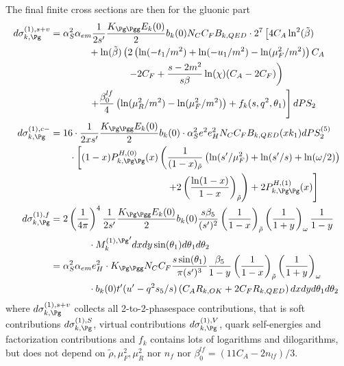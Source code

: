 The final finite cross sections are then for the gluonic part
\begin{align}
d\sigma_{k,\Pg}^{(1),s+v} &= \alpha_S^2\alpha_{em} \frac 1 {2s'} \frac {K_{\Pg\Pgg}E_k(0)} 2 b_k(0) N_C C_F B_{k,QED} \cdot 2^7 \left[ 4C_A\ln^2(\tilde\beta) \right.\nonumber\\
 &\hspace{40pt} +\ln(\tilde\beta)\left( 	2\left(\ln(-t_1/m^2)+\ln(-u_1/m^2)-\ln(\mu_F^2/m^2)\right)C_A \right. \nonumber\\
 &\hspace{80pt}\left. - 2C_F + \frac{s-2m^2}{s\beta}\ln(\chi)(C_A-2C_F) \right) \nonumber\\
 &\hspace{40pt}\left. + \frac {\beta_0^{lf}}{4}\left(\ln(\mu_R^2/m^2)- \ln(\mu_F^2/m^2)\right) + f_k(s,q^2,\theta_1) \right] dPS_2\\
d\sigma_{k,\Pg}^{(1),c-} &= 16\cdot \frac 1 {2xs'} \frac {K_{\Pg\Pgg}E_k(0)} 2 b_k(0) \cdot \alpha_S^2e^2e_H^2N_C C_F B_{k,QED}(xk_1) dPS_{2}^{(5)} \nonumber\\
 &\hspace{20pt}\cdot \left[ (1-x)P_{k,\Pg\Pg}^{H,(0)}(x)\left(\frac{1}{(1-x)_{\tilde\rho}}\left(\ln(s'/\mu_F^2) + \ln(s'/s) + \ln(\omega/2)\right) \right.\right.\nonumber\\
 &\hspace{120pt} \left.\left. + 2\left(\frac{\ln(1-x)}{1-x}\right)_{\tilde\rho} \right) + 2P_{k,\Pg\Pg}^{H,(1)}(x)\right]\\
d\sigma_{k,\Pg}^{(1),f} &= 2 \left(\frac 1 {4\pi}\right)^4 \frac 1 {2s'} \frac {K_{\Pg\Pgg}E_k(0)} 2 b_k(0) \frac{s\beta_5}{(s')^2} \left(\frac 1 {1-x}\right)_{\tilde\rho} \left(\frac 1 {1+y}\right)_\omega \frac 1 {1-y} \nonumber\\
 &\hspace{40pt} \cdot {M_k^{(1),\Pg}}' dxdy\sin(\theta_1)d\theta_1d\theta_2\\
 &= \alpha_S^2\alpha_{em}e_H^2 \cdot K_{\Pg\Pgg} N_C C_F \frac{s\sin(\theta_1)}{\pi(s')^3} \frac{\beta_5}{1-y} \left(\frac 1 {1-x}\right)_{\tilde\rho} \left(\frac 1 {1+y}\right)_\omega \nonumber\\
 &\hspace{40pt} \cdot b_k(0)t'(u'-q^2s_5/s) \left(C_A R_{k,OK} + 2C_F R_{k,QED}\right) dxdyd\theta_1d\theta_2
\end{align}
where $d\sigma_{k,\Pg}^{(1),s+v}$ collects all 2-to-2-phasespace contributions, that is soft contributions $d\sigma_{k,\Pg}^{(1),S}$, virtual contributions $d\sigma_{k,\Pg}^{(1),V}$, quark self-energies and factorization contributions and $f_k$ contains lots of logarithms and dilogarithms, but does not depend on $\tilde\rho,\mu_F^2,\mu_R^2$ nor $n_f$ nor $\beta_0^{lf} = (11C_A - 2n_{lf})/3$.

